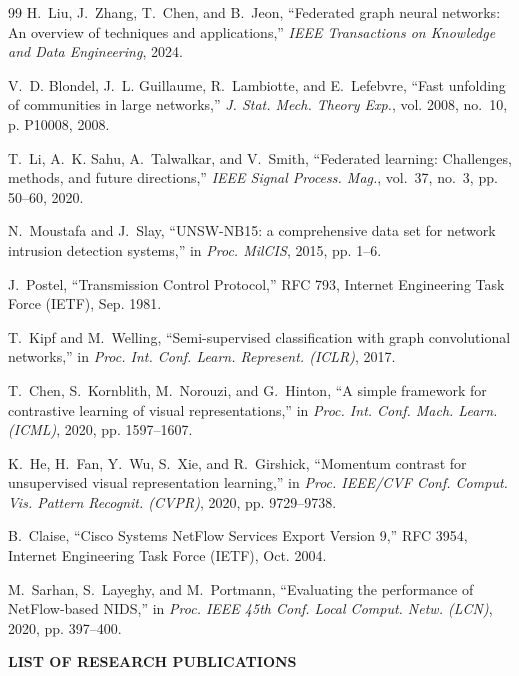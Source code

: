 \documentclass[12pt,a4paper]{report}
\begin{document}
\begin{thebibliography}{99}
H.~Liu, J.~Zhang, T.~Chen, and B.~Jeon, ``Federated graph neural networks: An overview of techniques and applications,'' \emph{IEEE Transactions on Knowledge and Data Engineering}, 2024.

V.~D. Blondel, J.~L. Guillaume, R.~Lambiotte, and E.~Lefebvre, ``Fast unfolding of communities in large networks,'' \emph{J. Stat. Mech. Theory Exp.}, vol. 2008, no.~10, p. P10008, 2008.

T.~Li, A.~K. Sahu, A.~Talwalkar, and V.~Smith, ``Federated learning: Challenges, methods, and future directions,'' \emph{IEEE Signal Process. Mag.}, vol.~37, no.~3, pp. 50--60, 2020.

N.~Moustafa and J.~Slay, ``UNSW-NB15: a comprehensive data set for network intrusion detection systems,'' in \emph{Proc. MilCIS}, 2015, pp. 1--6.

J.~Postel, ``Transmission Control Protocol,'' RFC 793, Internet Engineering Task Force (IETF), Sep. 1981.

T.~Kipf and M.~Welling, ``Semi-supervised classification with graph convolutional networks,'' in \emph{Proc. Int. Conf. Learn. Represent. (ICLR)}, 2017.

T.~Chen, S.~Kornblith, M.~Norouzi, and G.~Hinton, ``A simple framework for contrastive learning of visual representations,'' in \emph{Proc. Int. Conf. Mach. Learn. (ICML)}, 2020, pp. 1597--1607.

K.~He, H.~Fan, Y.~Wu, S.~Xie, and R.~Girshick, ``Momentum contrast for unsupervised visual representation learning,'' in \emph{Proc. IEEE/CVF Conf. Comput. Vis. Pattern Recognit. (CVPR)}, 2020, pp. 9729--9738.

B.~Claise, ``Cisco Systems NetFlow Services Export Version 9,'' RFC 3954, Internet Engineering Task Force (IETF), Oct. 2004.

M.~Sarhan, S.~Layeghy, and M.~Portmann, ``Evaluating the performance of NetFlow-based NIDS,'' in \emph{Proc. IEEE 45th Conf. Local Comput. Netw. (LCN)}, 2020, pp. 397--400.
\end{thebibliography}\clearpage\label{sec:publications}%
\newpage
\thispagestyle{plain}
\begin{center}
    {\fontsize{14}{17}\selectfont \textbf{\color{amritared}LIST OF RESEARCH PUBLICATIONS}}\\[16pt]
\end{center}
\end{document}
